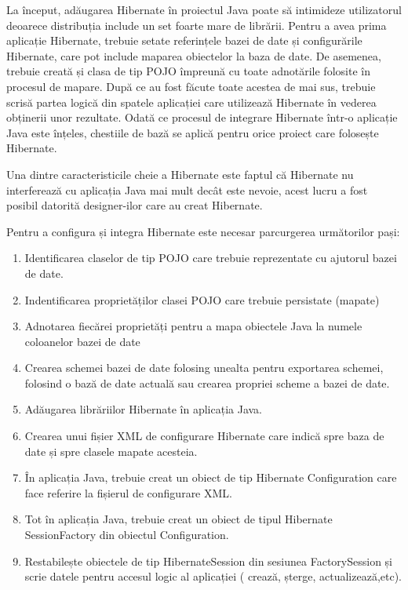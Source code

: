 \documentclass[12pt]{book}
\begin{document}
La început, adăugarea Hibernate în proiectul Java poate să intimideze utilizatorul deoarece distribuția include un set foarte mare de librării. Pentru a avea prima aplicație Hibernate, trebuie setate referințele bazei de date și configurările Hibernate, care pot include maparea obiectelor la baza de date. De asemenea, trebuie creată și clasa de tip POJO împreună cu toate adnotările folosite în procesul de mapare. După ce au fost făcute toate acestea de mai sus, trebuie scrisă partea logică din spatele aplicației care utilizează Hibernate în vederea obținerii unor rezultate. Odată ce procesul de integrare Hibernate într-o aplicație Java este înțeles, chestiile de bază se aplică pentru orice proiect care folosește Hibernate.

Una dintre caracteristicile cheie a Hibernate este faptul că Hibernate nu interferează cu aplicația Java mai mult decât este nevoie, acest lucru a fost posibil datorită designer-ilor care au creat Hibernate. 

Pentru a configura și integra Hibernate este necesar parcurgerea următorilor pași:
\begin{addmargin}[4em]{1em}
	\begin{enumerate}
	\item Identificarea claselor de tip POJO care trebuie reprezentate cu ajutorul bazei de date.
	\item Indentificarea proprietăților clasei POJO care trebuie persistate (mapate)
	\item Adnotarea fiecărei proprietăți pentru a mapa obiectele Java la numele coloanelor bazei de date
	\item Crearea schemei bazei de date folosing unealta pentru exportarea schemei, folosind o bază de date actuală sau crearea propriei scheme a bazei de date.
	\item Adăugarea librăriilor Hibernate în aplicația Java.
	\item Crearea unui fișier XML de configurare Hibernate care indică spre baza de date și spre clasele mapate acesteia.
	\item În aplicația Java, trebuie creat un obiect de tip Hibernate Configuration care face referire la fișierul de configurare XML.
	\item Tot în aplicația Java, trebuie creat un obiect de tipul Hibernate SessionFactory din obiectul Configuration.
	\item Restabilește obiectele de tip HibernateSession din sesiunea FactorySession și scrie datele pentru accesul logic al aplicației ( crează, șterge, actualizează,etc).
\end{enumerate}
\end{addmargin}
\end{document}
